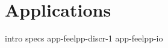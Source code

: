 \chapter{Applications}
\label{chap:applications}

{intro}
{specs}
{app-feelpp-discr-1}
{app-feelpp-io}

